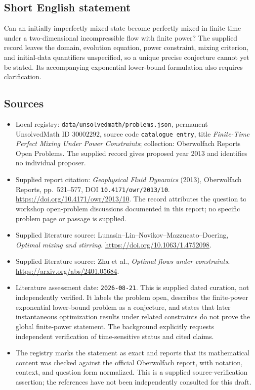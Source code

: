 \documentclass[11pt]{article}
\begin{document}
\subsection{Short English statement}
Can an initially imperfectly mixed state become perfectly mixed in finite time under a two-dimensional incompressible flow with finite power? The supplied record leaves the domain, evolution equation, power constraint, mixing criterion, and initial-data quantifiers unspecified, so a unique precise conjecture cannot yet be stated. Its accompanying exponential lower-bound formulation also requires clarification.
\subsection{Sources}
\begin{itemize}
\item Local registry: \texttt{data/unsolvedmath/problems.json}, permanent UnsolvedMath ID \(30002292\), source code \texttt{catalogue entry}, title \emph{Finite-Time Perfect Mixing Under Power Constraints}; collection: Oberwolfach Reports Open Problems. The supplied record gives proposed year 2013 and identifies no individual proposer.
\item Supplied report citation: \emph{Geophysical Fluid Dynamics} (2013), Oberwolfach Reports, pp.\ 521--577, DOI \texttt{10.4171/owr/2013/10}. \url{https://doi.org/10.4171/owr/2013/10}. The record attributes the question to workshop open-problem discussions documented in this report; no specific problem page or passage is supplied.
\item Supplied literature source: Lunasin--Lin--Novikov--Mazzucato--Doering, \emph{Optimal mixing and stirring}. \url{https://doi.org/10.1063/1.4752098}.
\item Supplied literature source: Zhu et al., \emph{Optimal flows under constraints}. \url{https://arxiv.org/abs/2401.05684}.
\item Literature assessment date: \texttt{2026-08-21}. This is supplied dated curation, not independently verified. It labels the problem open, describes the finite-power exponential lower-bound problem as a conjecture, and states that later instantaneous optimization results under related constraints do not prove the global finite-power statement. The background explicitly requests independent verification of time-sensitive status and cited claims.
\item The registry marks the statement as exact and reports that its mathematical content was checked against the official Oberwolfach report, with notation, context, and question form normalized. This is a supplied source-verification assertion; the references have not been independently consulted for this draft.
\end{itemize}
\end{document}
